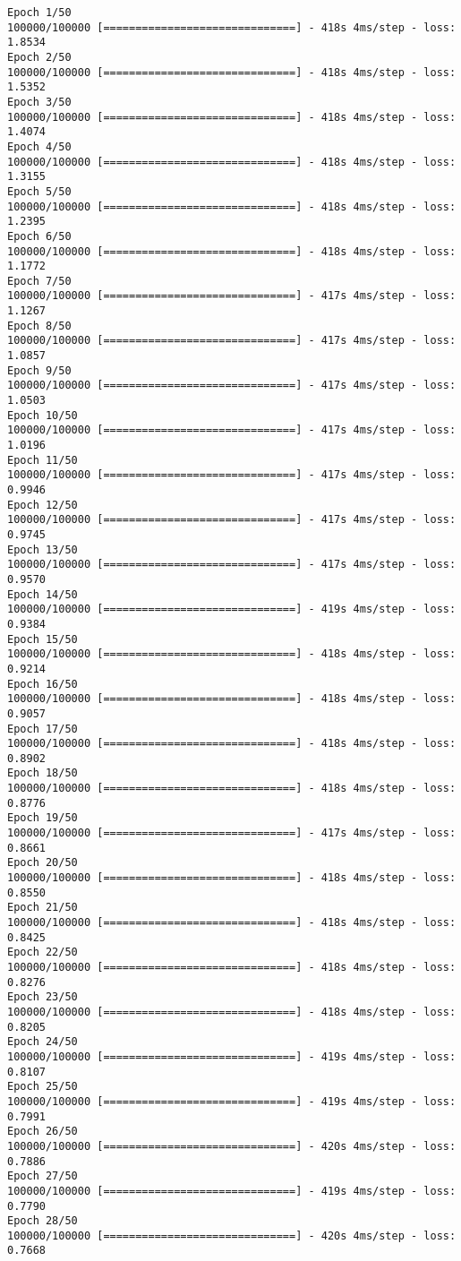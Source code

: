 \documentclass[11pt]{article}
\begin{document}
    \begin{Verbatim}[commandchars=\\\{\}]
Epoch 1/50
100000/100000 [==============================] - 418s 4ms/step - loss: 1.8534
Epoch 2/50
100000/100000 [==============================] - 418s 4ms/step - loss: 1.5352
Epoch 3/50
100000/100000 [==============================] - 418s 4ms/step - loss: 1.4074
Epoch 4/50
100000/100000 [==============================] - 418s 4ms/step - loss: 1.3155
Epoch 5/50
100000/100000 [==============================] - 418s 4ms/step - loss: 1.2395
Epoch 6/50
100000/100000 [==============================] - 418s 4ms/step - loss: 1.1772
Epoch 7/50
100000/100000 [==============================] - 417s 4ms/step - loss: 1.1267
Epoch 8/50
100000/100000 [==============================] - 417s 4ms/step - loss: 1.0857
Epoch 9/50
100000/100000 [==============================] - 417s 4ms/step - loss: 1.0503
Epoch 10/50
100000/100000 [==============================] - 417s 4ms/step - loss: 1.0196
Epoch 11/50
100000/100000 [==============================] - 417s 4ms/step - loss: 0.9946
Epoch 12/50
100000/100000 [==============================] - 417s 4ms/step - loss: 0.9745
Epoch 13/50
100000/100000 [==============================] - 417s 4ms/step - loss: 0.9570
Epoch 14/50
100000/100000 [==============================] - 419s 4ms/step - loss: 0.9384
Epoch 15/50
100000/100000 [==============================] - 418s 4ms/step - loss: 0.9214
Epoch 16/50
100000/100000 [==============================] - 418s 4ms/step - loss: 0.9057
Epoch 17/50
100000/100000 [==============================] - 418s 4ms/step - loss: 0.8902
Epoch 18/50
100000/100000 [==============================] - 418s 4ms/step - loss: 0.8776
Epoch 19/50
100000/100000 [==============================] - 417s 4ms/step - loss: 0.8661
Epoch 20/50
100000/100000 [==============================] - 418s 4ms/step - loss: 0.8550
Epoch 21/50
100000/100000 [==============================] - 418s 4ms/step - loss: 0.8425
Epoch 22/50
100000/100000 [==============================] - 418s 4ms/step - loss: 0.8276
Epoch 23/50
100000/100000 [==============================] - 418s 4ms/step - loss: 0.8205
Epoch 24/50
100000/100000 [==============================] - 419s 4ms/step - loss: 0.8107
Epoch 25/50
100000/100000 [==============================] - 419s 4ms/step - loss: 0.7991
Epoch 26/50
100000/100000 [==============================] - 420s 4ms/step - loss: 0.7886
Epoch 27/50
100000/100000 [==============================] - 419s 4ms/step - loss: 0.7790
Epoch 28/50
100000/100000 [==============================] - 420s 4ms/step - loss: 0.7668

\end{Verbatim}
\end{document}
